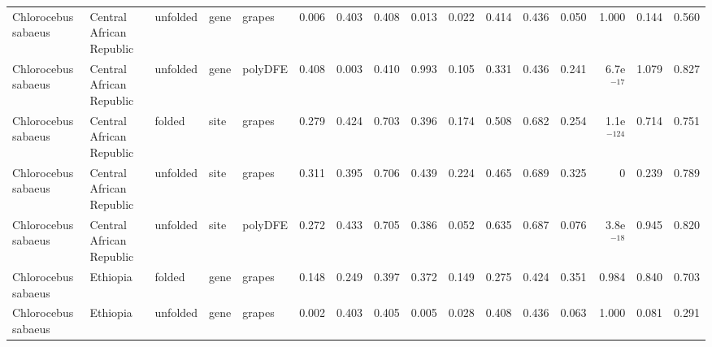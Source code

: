\begin{longtable}{lllllrrrrrrrrrrr}
 Chlorocebus sabaeus &  Central African Republic &  unfolded &  gene &   grapes &                              0.006 &                               0.403 &                 0.408 &                 0.013 &                              0.022 &                               0.414 &                 0.436 &                 0.050 &         1.000 &  0.144 &  0.560 \\
 Chlorocebus sabaeus &  Central African Republic &  unfolded &  gene &  polyDFE &                              0.408 &                               0.003 &                 0.410 &                 0.993 &                              0.105 &                               0.331 &                 0.436 &                 0.241 &  6.7e$^{-17}$ &  1.079 &  0.827 \\
 Chlorocebus sabaeus &  Central African Republic &    folded &  site &   grapes &                              0.279 &                               0.424 &                 0.703 &                 0.396 &                              0.174 &                               0.508 &                 0.682 &                 0.254 & 1.1e$^{-124}$ &  0.714 &  0.751 \\
 Chlorocebus sabaeus &  Central African Republic &  unfolded &  site &   grapes &                              0.311 &                               0.395 &                 0.706 &                 0.439 &                              0.224 &                               0.465 &                 0.689 &                 0.325 &             0 &  0.239 &  0.789 \\
 Chlorocebus sabaeus &  Central African Republic &  unfolded &  site &  polyDFE &                              0.272 &                               0.433 &                 0.705 &                 0.386 &                              0.052 &                               0.635 &                 0.687 &                 0.076 &  3.8e$^{-18}$ &  0.945 &  0.820 \\
 Chlorocebus sabaeus &                  Ethiopia &    folded &  gene &   grapes &                              0.148 &                               0.249 &                 0.397 &                 0.372 &                              0.149 &                               0.275 &                 0.424 &                 0.351 &         0.984 &  0.840 &  0.703 \\
 Chlorocebus sabaeus &                  Ethiopia &  unfolded &  gene &   grapes &                              0.002 &                               0.403 &                 0.405 &                 0.005 &                              0.028 &                               0.408 &                 0.436 &                 0.063 &         1.000 &  0.081 &  0.291 \\

\end{longtable}
